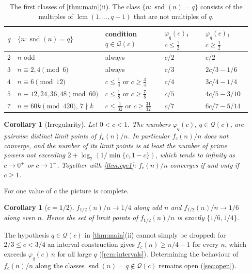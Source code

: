\documentclass[11pt,reqno]{amsart}
\numberwithin{equation}{section}
\newtheorem{corollary}[theorem]{Corollary}
\theoremstyle{definition}
\theoremstyle{remark}
\newcommand{\snd}{\operatorname{snd}}
\newcommand{\lcmop}{\operatorname{lcm}}
\begin{document}
\begin{table}[ht]
\centering
\caption{The first classes of \cref{thm:main}(ii). The class $\{n:\snd(n)=q\}$ consists of the multiples of $\lcmop(1,\dots,q-1)$ that are not multiples of $q$.}\label{tab:classes}
\begin{tabular}{@{}cllll@{}}
\toprule
$q$ & $\{n:\snd(n)=q\}$ & condition $q\in\mathcal Q(c)$ & $\varphi_q(c)$, $c\le\frac12$ & $\varphi_q(c)$, $c\ge\frac12$\\
\midrule
$2$ & $n$ odd & always & $c/2$ & $c/2$\\
$3$ & $n\equiv 2,4 \pmod 6$ & always & $c/3$ & $2c/3-1/6$\\
$4$ & $n\equiv 6\pmod{12}$ & $c\le\frac14$ or $c\ge\frac34$ & $c/4$ & $3c/4-1/4$\\
$5$ & $n\equiv 12,24,36,48\pmod{60}$ & $c\le\frac18$ or $c\ge\frac78$ & $c/5$ & $4c/5-3/10$\\
$7$ & $n\equiv 60k\pmod{420}$, $7\nmid k$ & $c\le\frac1{32}$ or $c\ge\frac{31}{32}$ & $c/7$ & $6c/7-5/14$\\
\bottomrule
\end{tabular}
\end{table}

\begin{corollary}[Irregularity]\label{cor:irregular}
Let $0<c<1$. The numbers $\varphi_q(c)$, $q\in\mathcal Q(c)$, are pairwise distinct limit points of $f_c(n)/n$. In particular $f_c(n)/n$ does not converge, and the number of its limit points is at least the number of prime powers not exceeding $2+\log_2(1/\min\{c,1-c\})$, which tends to infinity as $c\to0^+$ or $c\to1^-$. Together with \cref{thm:cge1}: $f_c(n)/n$ converges if and only if $c\ge1$.
\end{corollary}

For one value of $c$ the picture is complete.

\begin{corollary}[$c=1/2$]\label{cor:half}
$f_{1/2}(n)/n\to1/4$ along odd $n$ and $f_{1/2}(n)/n\to1/6$ along even $n$. Hence the set of limit points of $f_{1/2}(n)/n$ is exactly $\{1/6,1/4\}$.
\end{corollary}

The hypothesis $q\in\mathcal Q(c)$ in \cref{thm:main}(ii) cannot simply be dropped: for $2/3\le c<3/4$ an interval construction gives $f_c(n)\ge n/4-1$ for every $n$, which exceeds $\varphi_q(c)\,n$ for all large $q$ (\cref{rem:intervals}). Determining the behaviour of $f_c(n)/n$ along the classes $\snd(n)=q\notin\mathcal Q(c)$ remains open (\cref{sec:open}).
\end{document}

